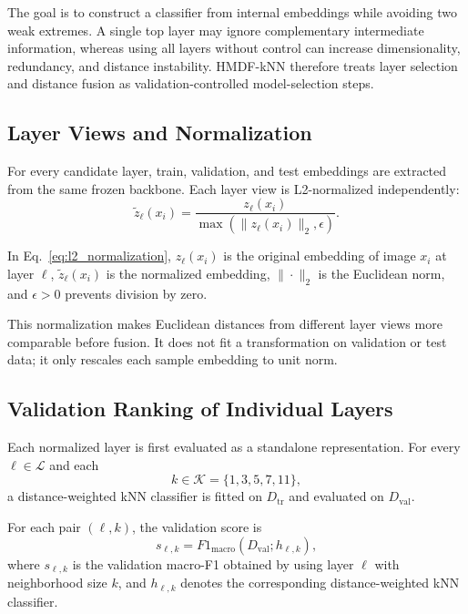 \documentclass[main.tex]{subfiles}
\begin{document}
The goal is to construct a classifier from internal embeddings while avoiding two weak extremes. A single top layer may ignore complementary intermediate information, whereas using all layers without control can increase dimensionality, redundancy, and distance instability. HMDF-kNN therefore treats layer selection and distance fusion as validation-controlled model-selection steps.

\subsection{Layer Views and Normalization}

For every candidate layer, train, validation, and test embeddings are extracted from the same frozen backbone. Each layer view is L2-normalized independently:
\begin{equation}
  \tilde{z}_{\ell}(x_i)
  =
  \frac{z_{\ell}(x_i)}
  {\max(\|z_{\ell}(x_i)\|_2,\epsilon)} .
  \label{eq:l2_normalization}
\end{equation}

In Eq.~\eqref{eq:l2_normalization}, \(z_{\ell}(x_i)\) is the original embedding of image \(x_i\) at layer \(\ell\), \(\tilde{z}_{\ell}(x_i)\) is the normalized embedding, \(\|\cdot\|_2\) is the Euclidean norm, and \(\epsilon>0\) prevents division by zero.

This normalization makes Euclidean distances from different layer views more comparable before fusion. It does not fit a transformation on validation or test data; it only rescales each sample embedding to unit norm.

\subsection{Validation Ranking of Individual Layers}

Each normalized layer is first evaluated as a standalone representation. For every \(\ell\in\mathcal{L}\) and each
\begin{equation}
  k \in \mathcal{K} = \{1,3,5,7,11\},
\end{equation}
a distance-weighted kNN classifier is fitted on \(D_{\mathrm{tr}}\) and evaluated on \(D_{\mathrm{val}}\).

For each pair \((\ell,k)\), the validation score is
\begin{equation}
  s_{\ell,k}
  =
  F1_{\mathrm{macro}}
  \left(D_{\mathrm{val}}; h_{\ell,k}\right),
\end{equation}
where \(s_{\ell,k}\) is the validation macro-F1 obtained by using layer \(\ell\) with neighborhood size \(k\), and \(h_{\ell,k}\) denotes the corresponding distance-weighted kNN classifier.
\end{document}
